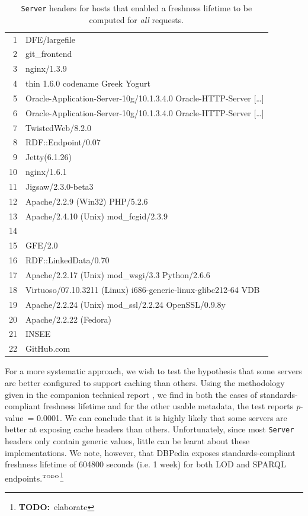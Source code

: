 \documentclass{llncs}
\newcommand{\pvalue}{\textit{p}-value\ }
\newcommand{\httph}[1]{\texttt{#1}}
\newcommand{\todo}[1]{\ensuremath{^{\textrm{\tiny{TODO}\normalsize}}}\footnote{\textbf{TODO:}~#1}}
\begin{document}
\begin{table}[h]
  \caption{\httph{Server} headers for hosts that enabled a freshness
    lifetime to be computed for \emph{all} requests.}\label{tab:servers}
\begin{center}
\begin{tabular}{rl}
  \hline
  1 & DFE/largefile \\ 
  2 & git\_frontend \\ 
  3 & nginx/1.3.9 \\ 
  4 & thin 1.6.0 codename Greek Yogurt \\ 
  5 & Oracle-Application-Server-10g/10.1.3.4.0 Oracle-HTTP-Server [\ldots]\\
  6 & Oracle-Application-Server-10g/10.1.3.4.0 Oracle-HTTP-Server [\ldots]\\
  7 & TwistedWeb/8.2.0 \\ 
  8 & RDF::Endpoint/0.07 \\ 
  9 & Jetty(6.1.26) \\ 
  10 & nginx/1.6.1 \\ 
  11 & Jigsaw/2.3.0-beta3 \\ 
  12 & Apache/2.2.9 (Win32) PHP/5.2.6 \\ 
  13 & Apache/2.4.10 (Unix) mod\_fcgid/2.3.9 \\ 
  14 &  \\ 
  15 & GFE/2.0 \\ 
  16 & RDF::LinkedData/0.70 \\ 
  17 & Apache/2.2.17 (Unix) mod\_wsgi/3.3 Python/2.6.6 \\ 
  18 & Virtuoso/07.10.3211 (Linux) i686-generic-linux-glibc212-64  VDB \\ 
  19 & Apache/2.2.24 (Unix) mod\_ssl/2.2.24 OpenSSL/0.9.8y \\ 
  20 & Apache/2.2.22 (Fedora) \\ 
  21 & INSEE \\ 
  22 & GitHub.com \\ 
   \hline
\end{tabular}
\end{center}
\end{table}



For a more systematic approach, we wish to test the hypothesis that
some servers are better configured to support caching than others.
Using the methodology given in the companion technical report
\cite{kjernsmo_add_survey_2015}, we find in
both the cases of standards-compliant freshness lifetime and for the other
usable metadata, the test reports \pvalue = 0.0001. We can conclude
that it is highly likely that some servers are better at exposing
cache headers than others. Unfortunately, since most \httph{Server}
headers only contain generic values, little can be learnt about these
implementations. We note, however, that DBPedia exposes
standards-compliant freshness lifetime of 604800 seconds (i.e. 1 week) for
both LOD and SPARQL endpoints.\todo{elaborate}
\end{document}
